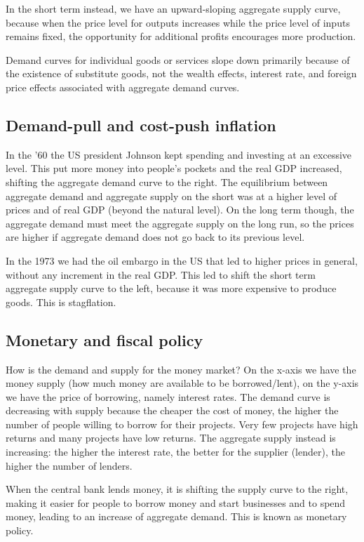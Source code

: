 In the short term instead, we have an upward-sloping aggregate supply curve, because when the price level for outputs increases while the price level of inputs remains fixed, the opportunity for additional profits encourages more production.

Demand curves for individual goods or services slope down primarily because of the existence of substitute goods, not the wealth effects, interest rate, and foreign price effects associated with aggregate demand curves.

\subsection{Demand-pull and cost-push inflation}
In the '60 the US president Johnson kept spending and investing at an excessive level. This put more money into people's pockets and the real GDP increased, shifting the aggregate demand curve to the right. The equilibrium between aggregate demand and aggregate supply on the short was at a higher level of prices and of real GDP (beyond the natural level). On the long term though, the aggregate demand must meet the aggregate supply on the long run, so the prices are higher if aggregate demand does not go back to its previous level.

In the 1973 we had the oil embargo in the US that led to higher prices in general, without any increment in the real GDP. This led to shift the short term aggregate supply curve to the left, because it was more expensive to produce goods. This is stagflation.

\subsection{Monetary and fiscal policy}
How is the demand and supply for the money market? On the x-axis we have the money supply (how much money are available to be borrowed/lent), on the y-axis we have the price of borrowing, namely interest rates. The demand curve is decreasing with supply because the cheaper the cost of money, the higher the number of people willing to borrow for their projects. Very few projects have high returns and many projects have low returns. The aggregate supply instead is increasing: the higher the interest rate, the better for the supplier (lender), the higher the number of lenders. 

When the central bank lends money, it is shifting the supply curve to the right, making it easier for people to borrow money and start businesses and to spend money, leading to an increase of aggregate demand. This is known as monetary policy.

